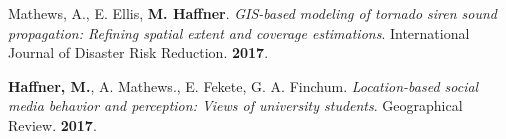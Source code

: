 




\begin{cventries}
   \cventry
      {}
      {}
      {}
      {}
      {
        \begin{cvitems}
          \vspace{-4mm}
        \item
          {Mathews, A., E. Ellis, \textbf{M. Haffner}.
            \textit{GIS-based modeling of tornado siren sound propagation:
              Refining spatial extent and coverage estimations}. International
            Journal of Disaster Risk Reduction. \textbf{2017}.} \\
          \vspace{-2mm}
        \end{cvitems}
    }
   \cventry
      {}
      {}
      {}
      {}
      {
        \begin{cvitems}
          \vspace{-4mm}
        \item {\textbf{Haffner, M.}, A. Mathews., E. Fekete, G. A. Finchum.
            \textit{Location-based social media behavior and perception: Views
              of university students}. Geographical Review. \textbf{2017}.} \\
          \vspace{-2mm}
        \end{cvitems}
    }
\end{cventries}




